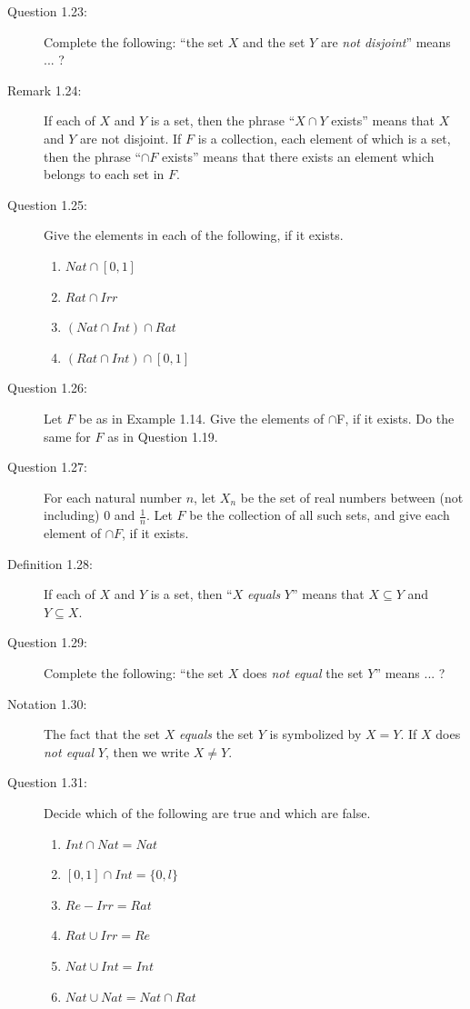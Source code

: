 \documentclass{book}
\begin{document}
\begin{description}
\item[Question 1.23:] Complete the following: ``the set $X$ and the set $Y$ are \emph{not disjoint}'' means ... ?

\item[Remark 1.24:] If each of $X$ and $Y$ is a set, then the phrase ``$X \cap Y$ exists'' means that $X$ and $Y$ are not disjoint. If $F$ is a collection, each element of which is a set, then the phrase ``$\cap F$ exists'' means that there exists an element which belongs to each set in $F$.

\item[Question 1.25:] Give the elements in each of the following, if it exists.
\begin{enumerate}[\hspace{1cm}(a)]
  \item $Nat \cap [0,1]$
  \item $Rat \cap Irr$
  \item $(Nat \cap Int) \cap Rat$
  \item $(Rat \cap Int) \cap [0,1]$
\end{enumerate}

\item[Question 1.26:] Let $F$ be as in Example 1.14. Give the elements of $\cap $F, if it exists. Do the same for $F$ as in Question 1.19.

\item[Question 1.27:] For each natural number $n$, let $X_{n}$ be the set of real numbers between (not including) $0$ and $\frac{1}{n}$. Let $F$ be the collection of all such sets, and give each element of $\cap F$, if it exists.

\item[Definition 1.28:] If each of $X$ and $Y$ is a set, then ``$X$ \emph{equals} $Y$'' means that $X \subseteq Y$ and $Y \subseteq X$.

\item[Question 1.29:] Complete the following: ``the set $X$ does \emph{not equal} the set $Y$'' means ... ?

\item[Notation 1.30:] The fact that the set $X$ \emph{equals} the set $Y$ is symbolized by $X = Y$. If $X$ does \emph{not equal} $Y$, then we write $X \neq Y$.

\item[Question 1.31:] Decide which of the following are true and which are false.
\begin{enumerate}[\hspace{1cm}(a)]
  \item $Int \cap Nat = Nat$
  \item $[0,1] \cap Int = \{ 0,l \}$
  \item $Re - Irr = Rat$
  \item $Rat \cup Irr = Re$
  \item $Nat \cup Int = Int$
  \item $Nat \cup Nat = Nat \cap Rat$
\end{enumerate}


\end{description}
\end{document}
